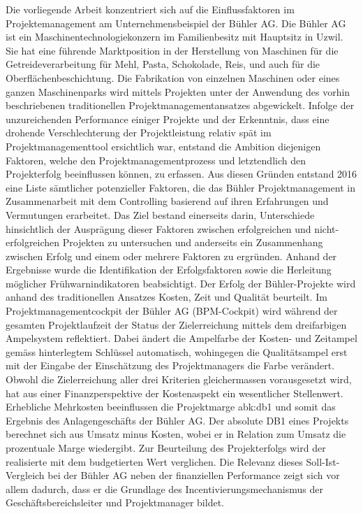 \newline\newline
Die vorliegende Arbeit konzentriert sich auf die Einflussfaktoren im Projektemanagement am Unternehmensbeispiel der Bühler AG. Die Bühler AG ist ein Maschinentechnologiekonzern im Familienbesitz mit Hauptsitz in Uzwil. Sie hat eine führende Marktposition in der Herstellung von Maschinen für die Getreideverarbeitung für Mehl, Pasta, Schokolade, Reis, und auch für die Oberflächenbeschichtung. Die Fabrikation von einzelnen Maschinen oder eines ganzen Maschinenparks wird mittels Projekten unter der Anwendung des vorhin beschriebenen traditionellen Projektmanagementansatzes abgewickelt. Infolge der unzureichenden Performance einiger Projekte und der Erkenntnis, dass eine drohende Verschlechterung der Projektleistung relativ spät im Projektmanagementtool ersichtlich war, entstand die Ambition diejenigen Faktoren, welche den Projektmanagementprozess und letztendlich den Projekterfolg beeinflussen können, zu erfassen. Aus diesen Gründen entstand 2016 eine Liste sämtlicher potenzieller Faktoren, die das Bühler Projektmanagement in Zusammenarbeit mit dem Controlling basierend auf ihren Erfahrungen und Vermutungen erarbeitet. Das Ziel bestand einerseits darin, Unterschiede hinsichtlich der Ausprägung dieser Faktoren zwischen erfolgreichen und nicht-erfolgreichen Projekten zu untersuchen und anderseits ein Zusammenhang zwischen Erfolg und einem oder mehrere Faktoren zu ergründen. Anhand der Ergebnisse wurde die Identifikation der Erfolgsfaktoren sowie die Herleitung möglicher Frühwarnindikatoren beabsichtigt. Der Erfolg der Bühler-Projekte wird anhand des traditionellen Ansatzes Kosten, Zeit und Qualität beurteilt. Im Projektmanagementcockpit der Bühler AG (BPM-Cockpit) wird während der gesamten Projektlaufzeit der Status der Zielerreichung mittels dem dreifarbigen Ampelsystem reflektiert. Dabei ändert die Ampelfarbe der Kosten- und Zeitampel gemäss hinterlegtem Schlüssel automatisch, wohingegen die Qualitätsampel erst mit der Eingabe der Einschätzung des Projektmanagers die Farbe verändert. Obwohl die Zielerreichung aller drei Kriterien gleichermassen vorausgesetzt wird, hat aus einer Finanzperspektive der Kostenaspekt ein wesentlicher Stellenwert. Erhebliche Mehrkosten beeinflussen die Projektmarge \gls{abk:db1} und somit das Ergebnis des Anlagengeschäfts der Bühler AG. Der absolute DB1 eines Projekts berechnet sich aus Umsatz minus Kosten, wobei er in Relation zum Umsatz die prozentuale Marge wiedergibt. Zur Beurteilung des Projekterfolgs wird der realisierte mit dem budgetierten Wert verglichen. Die Relevanz dieses Soll-Ist-Vergleich bei der Bühler AG neben der finanziellen Performance zeigt sich vor allem dadurch, dass er die Grundlage des Incentivierungsmechanismus der Geschäftsbereichsleiter und Projektmanager bildet. 
